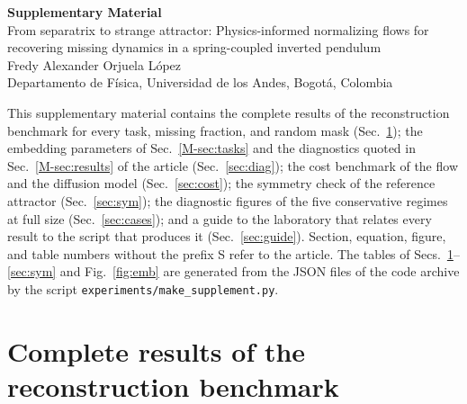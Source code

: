 \documentclass[10pt,letterpaper]{article}
\newcommand{\mref}[1]{\ref{M-#1}}
\begin{document}
\begin{center}
{\large\textbf{Supplementary Material}}\\[6pt]
{\large From separatrix to strange attractor: Physics-informed normalizing flows for recovering missing dynamics in a spring-coupled inverted pendulum}\\[8pt]
Fredy Alexander Orjuela L\'opez\\[2pt]
{\small Departamento de F\'isica, Universidad de los Andes, Bogot\'a, Colombia}
\end{center}

\bigskip
\noindent This supplementary material contains the complete results of the reconstruction benchmark for every task, missing fraction, and random mask (Sec.~\ref{sec:bench}); the embedding parameters of Sec.~\mref{sec:tasks} and the diagnostics quoted in Sec.~\mref{sec:results} of the article (Sec.~\ref{sec:diag}); the cost benchmark of the flow and the diffusion model (Sec.~\ref{sec:cost}); the symmetry check of the reference attractor (Sec.~\ref{sec:sym}); the diagnostic figures of the five conservative regimes at full size (Sec.~\ref{sec:cases}); and a guide to the laboratory that relates every result to the script that produces it (Sec.~\ref{sec:guide}). Section, equation, figure, and table numbers without the prefix S refer to the article. The tables of Secs.~\ref{sec:bench}--\ref{sec:sym} and Fig.~\ref{fig:emb} are generated from the JSON files of the code archive by the script \texttt{experiments/make\_supplement.py}.

\section{Complete results of the reconstruction benchmark}\label{sec:bench}
\end{document}
